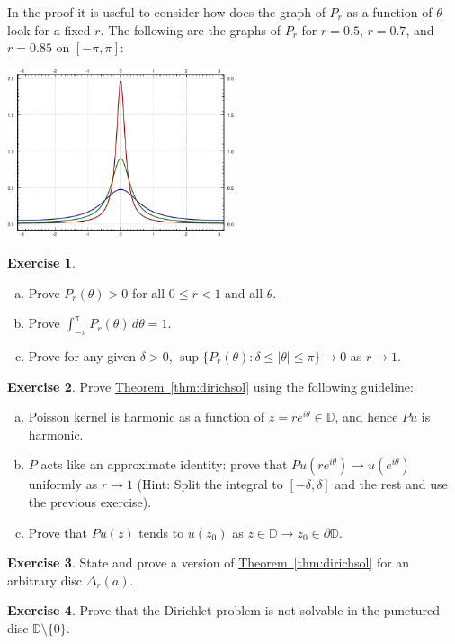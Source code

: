 \documentclass[12pt,openany]{book}
\newcommand{\abs}[1]{\left\lvert {#1} \right\rvert}
\newcommand{\D}{{\mathbb{D}}}
\theoremstyle{plain}
\theoremstyle{remark}
\theoremstyle{definition}
\newenvironment{exbox}{%
    \def\FrameCommand{\vrule width 1pt \relax\hspace {10pt}}%
    \MakeFramed {\advance \hsize -\width \FrameRestore }%
}{%
    \endMakeFramed
}
\newenvironment{exparts}{%
    \leavevmode\begin{enumerate}[a),noitemsep,topsep=0pt,parsep=0pt,partopsep=0pt]
}{%
    \end{enumerate}
}
\newenvironment{myfig}{%
    \begin{center}
}{%
    \end{center}
}
\theoremstyle{exercise}
\newtheorem{exercise}{Exercise}[section]
\theoremstyle{example}
\newcommand{\thmref}[1]{\hyperref[#1]{Theorem~\ref*{#1}}}
\begin{document}
\pagebreak[2]
In the proof it is useful to consider how
does the graph of $P_r$ as a function of $\theta$ look for a fixed $r$.
The following are the graphs of $P_r$ for $r=0.5$,
$r=0.7$, and $r=0.85$ on $[-\pi,\pi]$:

\begin{myfig}
\includegraphics[width=0.5\textwidth]{figures/poisson-kernel.pdf}
\end{myfig}



\begin{exbox}
\begin{exercise}
\begin{exparts}
\item
Prove $P_r(\theta) > 0$ for all $0 \leq r < 1$ and all $\theta$.
\item
Prove $\int_{-\pi}^{\pi} P_r(\theta) \, d\theta = 1$.
\item
Prove for any given $\delta > 0$,
$\sup \{P_r(\theta) : \delta \leq \abs{\theta} \leq \pi \} \to 0$ as
$r \to 1$.
\end{exparts}
\end{exercise}

\begin{exercise}
\pagebreak[1]%
Prove \thmref{thm:dirichsol} using the following guideline:
\begin{exparts}
\item
Poisson kernel is harmonic
as a function of $z=re^{i\theta} \in \D$, and hence
$Pu$ is harmonic.
\item
$P$ acts like an
approximate identity: prove that
$Pu(re^{i\theta}) \to u(e^{i\theta})$ uniformly as
$r \to 1$ (Hint: Split the integral to $[-\delta,\delta]$ and the rest
and use the previous exercise).
\item
Prove that $Pu(z)$ tends to $u(z_0)$ as
$z \in \D \to z_0 \in \partial \D$.
\pagebreak[2]
\end{exparts}
\end{exercise}

\begin{exercise}
State and prove a version of \thmref{thm:dirichsol} for an arbitrary disc
$\Delta_r(a)$.
\end{exercise}

\begin{exercise}
Prove that the Dirichlet problem is not solvable in the punctured disc $\D
\setminus \{ 0 \}$.
\end{exercise}
\end{exbox}
\end{document}
